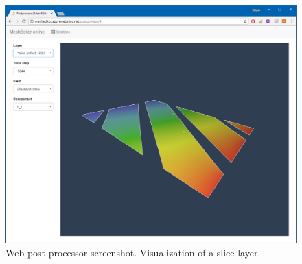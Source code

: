 \begin{figure}[H]
    \centering
    \includegraphics[width=\textwidth]{figures/chapter-data-management/web-post-processor-slice}
    \decoRule
    \caption{Web post-processor screenshot. Visualization of a slice layer.}
    \label{fig:web-post-processor-slice}
\end{figure}


